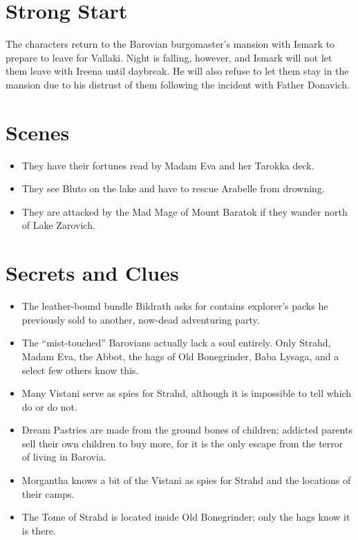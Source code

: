\documentclass[a4paper,11pt]{article}
\begin{document}
\pagebreak
\section{Strong Start}
\label{sec:StrongStart}
The characters return to the Barovian burgomaster's mansion with Ismark to prepare to leave for Vallaki.
Night is falling, however, and Ismark will not let them leave with Ireena until daybreak. He will also refuse
to let them stay in the mansion due to his distrust of them following the incident with Father Donavich.

\section{Scenes}
\label{sec:Scenes}
\begin{itemize}
  \item They have their fortunes read by Madam Eva and her Tarokka deck.
  \item They see Bluto on the lake and have to rescue Arabelle from drowning.
  \item They are attacked by the Mad Mage of Mount Baratok if they wander north of Lake Zarovich.
\end{itemize}

\section{Secrets and Clues}
\label{sec:SecretsAndClues}
\begin{itemize}
  \item The leather-bound bundle Bildrath asks for contains explorer's packs he previously sold to another,
  now-dead adventuring party.
  \item The ``mist-touched'' Barovians actually lack a soul entirely. Only Strahd, Madam Eva, the Abbot, the hags
  of Old Bonegrinder, Baba Lysaga, and a select few others know this.
  \item Many Vistani serve as spies for Strahd, although it is impossible to tell which do or do not.
  \item Dream Pastries are made from the ground bones of children; addicted parents sell their own children to 
  buy more, for it is the only escape from the terror of living in Barovia.
  \item Morgantha knows a bit of the Vistani as spies for Strahd and the locations of their camps.
  \item The Tome of Strahd is located inside Old Bonegrinder; only the hags know it is there.
\end{itemize}
\end{document}

